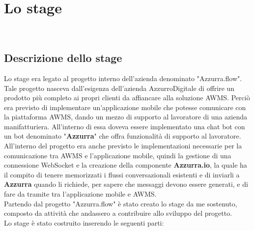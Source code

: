 
\chapter{Lo stage}
\label{cap:descrizione-stage}

\\

\section{Descrizione dello stage}
Lo stage era legato al progetto interno dell'azienda denominato "Azzurra.flow". Tale progetto nasceva dall'esigenza dell'azienda AzzurroDigitale di offrire un prodotto più completo ai propri clienti da affiancare alla soluzione \gls{AWMS}. Perciò era previsto di implementare un’applicazione mobile che potesse comunicare con la piattaforma \gls{AWMS}, dando un mezzo di supporto al lavoratore di una azienda manifatturiera. All'interno di essa doveva essere implementato una chat bot con un \gls{bot} denominato "\textbf{Azzurra}" che offra funzionalità di supporto al lavoratore. All'interno del progetto era anche previsto le implementazioni necessarie per la comunicazione tra \gls{AWMS} e l'applicazione mobile, quindi la gestione di una connessione \gls{WebSocket} e la creazione della componente \textbf{Azzurra.io}, la quale ha il compito di tenere memorizzati i flussi conversazionali esistenti e di inviarli a \textbf{Azzurra} quando li richiede, per sapere che messaggi devono essere generati, e di fare da tramite tra l'applicazione mobile e \gls{AWMS}.\\
Partendo dal progetto "Azzurra.flow" è stato creato lo stage da me sostenuto, composto da attività che andassero a contribuire allo sviluppo del progetto. \\
Lo stage è stato costruito inserendo le seguenti parti:


